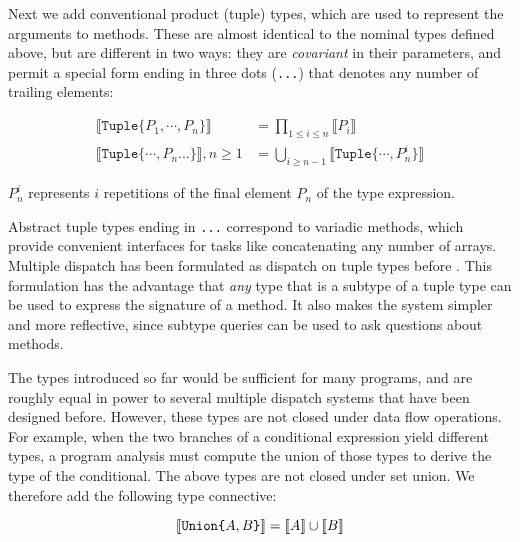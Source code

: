 Next we add conventional product (tuple) types, which are used to represent the
arguments to methods. These are almost identical to the nominal types defined above,
but are different in two ways: they are \emph{covariant} in their parameters, and permit
a special form ending in three dots (\texttt{...}) that denotes any number of trailing
elements:

\vspace{-3ex}
\begin{align*}
  \llbracket \texttt{Tuple\{}P_1,\cdots,P_n\texttt{\}} \rrbracket &= \prod_{1\leq i \leq n} \llbracket P_i \rrbracket \\
  \llbracket \texttt{Tuple\{}\cdots,P_n\texttt{...\}} \rrbracket, n\geq 1 &= \bigcup_{i\geq n-1} \llbracket \texttt{Tuple\{}\cdots,P_n^i\texttt{\}} \rrbracket
\end{align*}

\noindent
$P_n^i$ represents $i$ repetitions of the final element $P_n$ of the type expression.

Abstract tuple types ending in \texttt{...} correspond to variadic methods, which
provide convenient interfaces for tasks like concatenating any number of arrays.
Multiple dispatch has been formulated as dispatch on tuple types before \cite{Leavens1998}.
This formulation has the advantage that \emph{any} type that is a subtype of a
tuple type can be used to express the signature of a method.
It also makes the system simpler and more reflective, since subtype queries can be
used to ask questions about methods.

The types introduced so far would be sufficient for many programs, and are
roughly equal in power to several multiple dispatch systems that have been designed
before.
However, these types are not closed under data flow operations.
For example, when the two branches of a conditional expression yield different types,
a program analysis must compute the union of those types to derive the type of
the conditional.
The above types are not closed under set union.
We therefore add the following type connective:

\vspace{-3ex}
\[
  \llbracket \texttt{Union\{}A,B\texttt{\}} \rrbracket = \llbracket A \rrbracket \cup \llbracket B \rrbracket \\
\]

